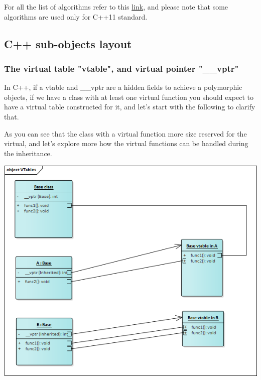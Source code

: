 \documentclass{article}
\begin{document}
For all the list of algorithms refer to this \href{http://www.cplusplus.com/reference/algorithm/}{link}, and please note that some algorithms are used only for C++11 standard.

\subsection{C++ sub-objects layout}
\subsubsection{The virtual table "vtable", and virtual pointer "\_\_vptr"}
In C++, if a vtable and \_\_vptr are a hidden fields to achieve a polymorphic objects, if we have a class with at least one virtual function you should expect to have a virtual table constructed for it, and let's start with the following to clarify that.


As you can see that the class with a virtual function more size reserved for the virtual, and let's explore more how the virtual functions can be handled during the inheritance.

\begin{center}
  \includegraphics[scale=0.50]{./imgs/vtables.png}
\end{center}
\end{document}
